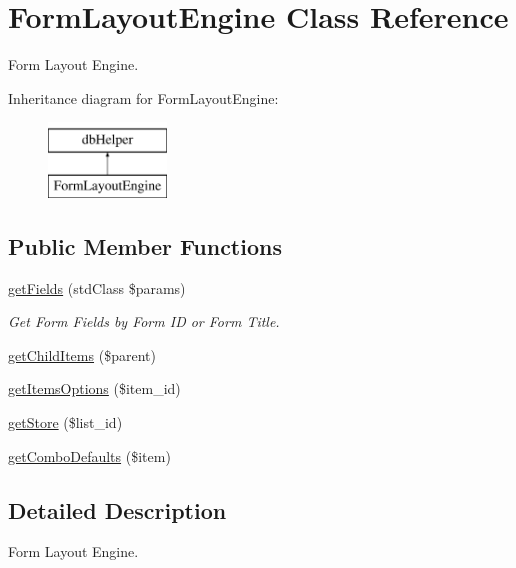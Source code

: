 \hypertarget{class_form_layout_engine}{\section{\-Form\-Layout\-Engine \-Class \-Reference}
\label{class_form_layout_engine}
}


\-Form \-Layout \-Engine.  


\-Inheritance diagram for \-Form\-Layout\-Engine\-:\begin{figure}[H]
\begin{center}
\leavevmode
\includegraphics[height=2.000000cm]{class_form_layout_engine}
\end{center}
\end{figure}
\subsection*{\-Public \-Member \-Functions}
\begin{DoxyCompactItemize}
\item 
\hyperlink{class_form_layout_engine_aac0ec25d9ed7255a0d2e2ad1174d324b}{get\-Fields} (std\-Class \$params)
\begin{DoxyCompactList}\small\item\em \-Get \-Form \-Fields by \-Form \-I\-D or \-Form \-Title. \end{DoxyCompactList}\item 
\hyperlink{class_form_layout_engine_a25eb9dec9c7fa7132bc97c113aae2bfe}{get\-Child\-Items} (\$parent)
\item 
\hyperlink{class_form_layout_engine_a89955ff647a3d7183e3468bac90f90a0}{get\-Items\-Options} (\$item\-\_\-id)
\item 
\hyperlink{class_form_layout_engine_a5b15a478954309f198a8435ce45e1997}{get\-Store} (\$list\-\_\-id)
\item 
\hyperlink{class_form_layout_engine_a8ac8fd2609c4b0bc23b1deaa36c2a43f}{get\-Combo\-Defaults} (\$item)
\end{DoxyCompactItemize}


\subsection{\-Detailed \-Description}
\-Form \-Layout \-Engine. 

